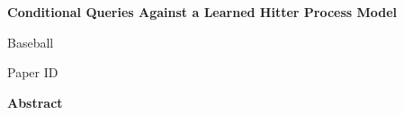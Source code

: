 \documentclass[11pt,letterpaper]{article}
\newcommand{\papertitle}{Conditional Queries Against a Learned Hitter Process Model}
\newcommand{\papertrack}{Baseball}  %
\newcommand{\paperid}{Paper ID}     %
\begin{document}
\raggedright
\thispagestyle{fancy}
\begin{center}
{\fontsize{18}{22}\selectfont\bfseries \papertitle\par}
\vspace{11pt}
{\fontsize{14}{17}\selectfont \papertrack\par \paperid\par}
\end{center}

\begin{center}{\fontsize{16}{19}\selectfont\bfseries Abstract}\end{center}
\vspace{-11pt}
\end{document}
